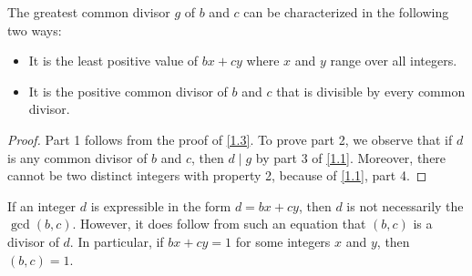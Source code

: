 \documentclass[11pt]{article}
\begin{document}
\begin{theorem}\label{1.4}
    The greatest common divisor \(g\) of \(b\) and \(c\) can be characterized in the following two ways:
    \begin{itemize}
        \item It is the least positive value of \(bx + cy\) where \(x\) and \(y\) range over
              all integers.
        \item It is the positive common divisor of \(b\) and \(c\) that is divisible by every
              common divisor.
    \end{itemize}
\end{theorem}

\begin{proof}
    Part 1 follows from the proof of \cref{1.3}. To prove part 2, we observe that if \(d\) is any common divisor of \(b\) and \(c\), then \(d \mid g\) by part 3 of \cref{1.1}. Moreover, there cannot be two distinct integers with property 2, because of \cref{1.1}, part 4.
\end{proof}

\begin{remark}
    If an integer \(d\) is expressible in the form \(d = bx + cy\), then \(d\) is not
    necessarily the \(\gcd(b, c)\). However, it does follow from such an equation
    that \((b, c)\) is a divisor of \(d\). In particular, if \(bx + cy = 1\) for some integers
    \(x\) and \(y\), then \((b, c) = 1\).
\end{remark}
\end{document}
